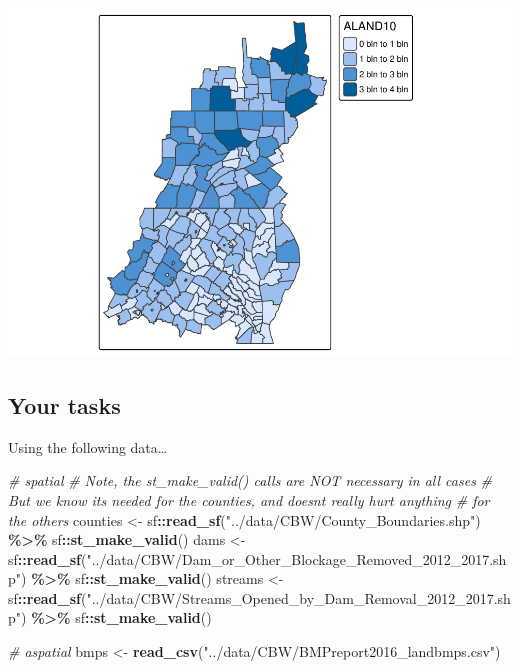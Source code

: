 \documentclass[]{article}
\newenvironment{Shaded}{\begin{snugshade}}{\end{snugshade}}
\newcommand{\CommentTok}[1]{\textcolor[rgb]{0.56,0.35,0.01}{\textit{#1}}}
\newcommand{\FunctionTok}[1]{\textcolor[rgb]{0.13,0.29,0.53}{\textbf{#1}}}
\newcommand{\NormalTok}[1]{#1}
\newcommand{\OtherTok}[1]{\textcolor[rgb]{0.56,0.35,0.01}{#1}}
\newcommand{\SpecialCharTok}[1]{\textcolor[rgb]{0.81,0.36,0.00}{\textbf{#1}}}
\newcommand{\StringTok}[1]{\textcolor[rgb]{0.31,0.60,0.02}{#1}}
\begin{document}
\includegraphics{lab02_files/figure-latex/remembering tmap-1.pdf}

\newpage

\subsection{Your tasks}\label{your-tasks}

Using the following data\ldots{}

\begin{Shaded}
\begin{Highlighting}[]
\CommentTok{\# spatial}
\CommentTok{\# Note, the st\_make\_valid() calls are NOT necessary in all cases}
\CommentTok{\# But we know it\textquotesingle{}s needed for the counties, and doesn\textquotesingle{}t really hurt anything}
\CommentTok{\# for the others}
\NormalTok{counties }\OtherTok{\textless{}{-}}\NormalTok{ sf}\SpecialCharTok{::}\FunctionTok{read\_sf}\NormalTok{(}\StringTok{"../data/CBW/County\_Boundaries.shp"}\NormalTok{) }\SpecialCharTok{\%\textgreater{}\%} 
\NormalTok{  sf}\SpecialCharTok{::}\FunctionTok{st\_make\_valid}\NormalTok{()}
\NormalTok{dams }\OtherTok{\textless{}{-}}\NormalTok{ sf}\SpecialCharTok{::}\FunctionTok{read\_sf}\NormalTok{(}\StringTok{"../data/CBW/Dam\_or\_Other\_Blockage\_Removed\_2012\_2017.shp"}\NormalTok{) }\SpecialCharTok{\%\textgreater{}\%} 
\NormalTok{  sf}\SpecialCharTok{::}\FunctionTok{st\_make\_valid}\NormalTok{()}
\NormalTok{streams }\OtherTok{\textless{}{-}}\NormalTok{ sf}\SpecialCharTok{::}\FunctionTok{read\_sf}\NormalTok{(}\StringTok{"../data/CBW/Streams\_Opened\_by\_Dam\_Removal\_2012\_2017.shp"}\NormalTok{) }\SpecialCharTok{\%\textgreater{}\%} 
\NormalTok{  sf}\SpecialCharTok{::}\FunctionTok{st\_make\_valid}\NormalTok{()}

\CommentTok{\# aspatial}
\NormalTok{bmps }\OtherTok{\textless{}{-}} \FunctionTok{read\_csv}\NormalTok{(}\StringTok{"../data/CBW/BMPreport2016\_landbmps.csv"}\NormalTok{)}
\end{Highlighting}
\end{Shaded}
\end{document}
